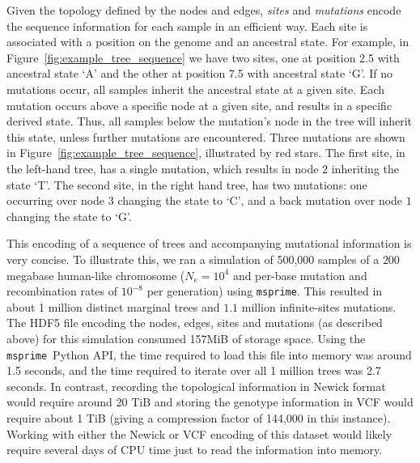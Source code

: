 \documentclass{article}
\newcommand{\msprime}{\texttt{msprime}}
\begin{document}
Given the topology defined by the nodes and edges, \emph{sites} and \emph{mutations}
encode the sequence information for each sample in an efficient way. Each site
is associated with a position on the genome and an ancestral state. For example,
in Figure~\ref{fig:example_tree_sequence} we have two sites, one at position
2.5 with ancestral state `A' and the other at position 7.5 with ancestral state `G'. If
no mutations occur, all samples inherit the ancestral state at a given site.
Each mutation occurs above a specific node at a given site,
and results in a specific derived state.
Thus, all samples below the mutation's node in the tree will inherit this state,
unless further mutations are encountered.
Three mutations are shown in Figure~\ref{fig:example_tree_sequence},
illustrated by red stars.
The first site, in the left-hand tree,
has a single mutation, which results in node $2$ inheriting the state `T'.
The second site, in the right hand tree, has two mutations:
one occurring over node $3$ changing the state to `C',
and a back mutation over node $1$ changing the state to `G'.

This encoding of a sequence of trees and accompanying mutational information is
very concise. To illustrate this, we ran a simulation of 500,000 samples of a
$200$ megabase human-like chromosome ($N_e=10^4$ and per-base mutation and
recombination rates of $10^{-8}$ per generation) using \msprime. This resulted
in about 1 million distinct marginal trees and $1.1$ million infinite-sites
mutations. The HDF5 file encoding the nodes, edges, sites and mutations (as
described above) for this simulation consumed 157MiB of storage space. Using
the \msprime\ Python API, the time required to load this file into memory was
around 1.5 seconds, and the time required to iterate over all 1 million trees
was 2.7 seconds. In contrast, recording the topological information in Newick
format would require around 20 TiB and storing the genotype information
in VCF would require about 1 TiB (giving a compression factor of 144,000 in
this instance).
Working with either the Newick or VCF encoding
of this dataset would likely require several
days of CPU time just to read the information into memory.
\end{document}
